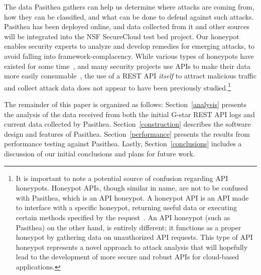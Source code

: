 The data Pasithea gathers can help us determine where attacks are coming from, how they can be classified, and what can be done to defend against such attacks.  
Pasithea has been deployed online, and data collected from it and other sources will be integrated into the NSF SecureCloud test bed project.  
Our honeypot enables security experts to analyze and develop remedies for emerging attacks, to avoid falling into framework-complacency.  
While various types of honeypots have existed for some time~\cite{Stoll:1989:CET:67554,Provos:2004:VHF:1251375.1251376}, and many security projects use APIs to make their data more easily consumable~\cite{Graham:2008:FAD:1355323,SCADA-Testbed-API}, the use of a REST API {\em itself} to attract malicious traffic and collect attack data does not appear to have been previously studied.\footnote{  
It is important to note a potential source of confusion regarding API honeypots. 
Honeypot APIs, though similar in name, are not to be confused with Pasithea, which is an API honeypot. 
A honeypot API is an API made to interface with a specific honeypot, returning useful data or executing certain methods specified by the request~\cite{Honeypot-API}. 
An API honeypot (such as Pasithea) on the other hand, is entirely different; it functions as a proper honeypot by gathering data on unauthorized API requests.  
This type of API honeypot represents a novel approach to attack analysis that will hopefully lead to the development of more secure and robust APIs for cloud-based applications.}

The remainder of this paper is organized as follows: 
Section~\ref{analysis} presents the analysis of the data received from both the initial G-star REST API logs and current data collected by Pasithea. 
Section~\ref{construction} describes the software design and features of Pasithea. 
Section~\ref{performance} presents the results from performance testing against Pasithea.
Lastly, Section~\ref{conclusions} includes a discussion of our initial conclusions and plans for future work.
